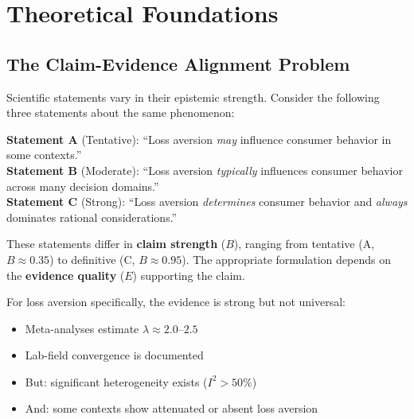 \documentclass[11pt,a4paper]{article}
\begin{document}
\vspace{1em}

\section{Theoretical Foundations}
\label{sec:theory}


\subsection{The Claim-Evidence Alignment Problem}

Scientific statements vary in their epistemic strength. Consider the following three statements about the same phenomenon:

\begin{practicalbox}[title={Example: Loss Aversion Claims}]
\textbf{Statement A} (Tentative): ``Loss aversion \textit{may} influence consumer behavior in some contexts.'' \\[0.3em]
\textbf{Statement B} (Moderate): ``Loss aversion \textit{typically} influences consumer behavior across many decision domains.'' \\[0.3em]
\textbf{Statement C} (Strong): ``Loss aversion \textit{determines} consumer behavior and \textit{always} dominates rational considerations.''
\end{practicalbox}

These statements differ in \textbf{claim strength} ($B$), ranging from tentative (A, $B \approx 0.35$) to definitive (C, $B \approx 0.95$). The appropriate formulation depends on the \textbf{evidence quality} ($E$) supporting the claim.

For loss aversion specifically, the evidence is strong but not universal:
\begin{itemize}
    \item Meta-analyses estimate $\lambda \approx 2.0$--$2.5$ \citep{KahnemanTversky1992}
    \item Lab-field convergence is documented \citep{PopeSchweitzer2011, Camerer1997}
    \item But: significant heterogeneity exists ($I^2 > 50\%$)
    \item And: some contexts show attenuated or absent loss aversion
\end{itemize}
\end{document}
